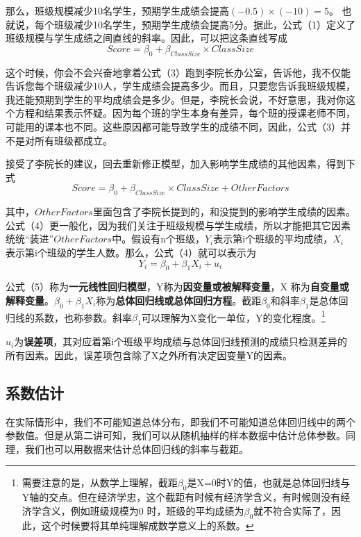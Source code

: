 \documentclass[cn,10pt,math=newtx,citestyle=gb7714-2015,bibstyle=gb7714-2015]{elegantbook}
\begin{document}
	那么，班级规模减少10名学生，预期学生成绩会提高$(-0.5)\times(-10)=5$。 也就说，每个班级减少10名学生，预期学生成绩会提高5分。据此，公式（1）定义了班级规模与学生成绩之间直线的斜率。因此，可以把这条直线写成
	\begin{equation}
		Score=\beta_0+\beta_{ClassSize}\times{ClassSize}
	\end{equation}
	
	这个时候，你会不会兴奋地拿着公式（3）跑到李院长办公室，告诉他，我不仅能告诉您每个班级减少10人，学生成绩会提高多少。而且，只要您告诉我班级规模，我还能预期到学生的平均成绩会是多少。但是，李院长会说，不好意思，我对你这个方程和结果表示怀疑。因为每个班的学生本身有差异，每个班的授课老师不同，可能用的课本也不同。这些原因都可能导致学生的成绩不同，因此，公式（3）并不是对所有班级都成立。
	
	接受了李院长的建议，回去重新修正模型，加入影响学生成绩的其他因素，得到下式
	\begin{equation}
		Score=\beta_0+\beta_{ClassSize}\times{ClassSize}+OtherFactors
	\end{equation}
	
	其中，$OtherFactors$里面包含了李院长提到的，和没提到的影响学生成绩的因素。公式（4）更一般化，因为我们关注于班级规模与学生成绩，所以才能把其它因素统统“装进”$OtherFactors$中。假设有n个班级，$Y_i$表示第i个班级的平均成绩，$X_i$ 表示第i个班级的学生人数。那么，公式（4）就可以表示为
	\begin{equation}
		Y_i=\beta_0+\beta_1X_i+u_i
	\end{equation}
	
	公式（5）称为\textbf{一元线性回归模型}，Y称为\textbf{因变量或被解释变量}，X 称为\textbf{自变量或解释变量}。$\beta_0+\beta_1X_i$称为\textbf{总体回归线或总体回归方程}。截距$\beta_0$和斜率$\beta_1$是总体回归线的系数，也称参数。斜率$\beta_1$可以理解为X变化一单位，Y的变化程度。\footnote{需要注意的是，从数学上理解，截距$\beta_0$是X=0时Y的值，也就是总体回归线与Y轴的交点。但在经济学忠，这个截距有时候有经济学含义，有时候则没有经济学含义，例如班级规模为0 时，班级的平均成绩为$\beta_0$就不符合实际了，因此，这个时候要将其单纯理解成数学意义上的系数。}
	
	$u_i$为\textbf{误差项}，其对应着第i个班级平均成绩与总体回归线预测的成绩只检测差异的所有因素。因此，误差项包含除了X之外所有决定因变量Y的因素。
	
	\subsection{系数估计}
	在实际情形中，我们不可能知道总体分布，即我们不可能知道总体回归线中的两个参数值。但是从第二讲可知，我们可以从随机抽样的样本数据中估计总体参数。同理，我们也可以用数据来估计总体回归线的斜率与截距。
	
\end{document}
